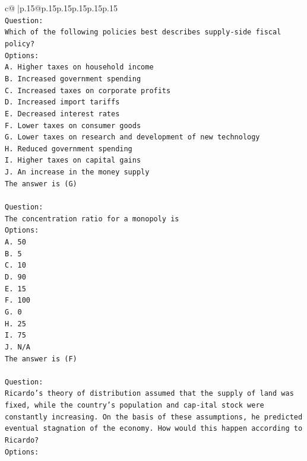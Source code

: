 \documentclass{article}
\begin{document}
{\begin{supertabular}{c@{$\;$}|p{.15\linewidth}@{}p{.15\linewidth}p{.15\linewidth}p{.15\linewidth}p{.15\linewidth}p{.15\linewidth}}
{{{\\ 
\texttt{Question:} \\
\texttt{Which of the following policies best describes supply{-}side fiscal policy?} \\
\texttt{Options:} \\
\texttt{A. Higher taxes on household income} \\
\texttt{B. Increased government spending} \\
\texttt{C. Increased taxes on corporate profits} \\
\texttt{D. Increased import tariffs} \\
\texttt{E. Decreased interest rates} \\
\texttt{F. Lower taxes on consumer goods} \\
\texttt{G. Lower taxes on research and development of new technology} \\
\texttt{H. Reduced government spending} \\
\texttt{I. Higher taxes on capital gains} \\
\texttt{J. An increase in the money supply} \\
\texttt{The answer is (G)} \\
\\ 
\texttt{Question:} \\
\texttt{The concentration ratio for a monopoly is} \\
\texttt{Options:} \\
\texttt{A. 50} \\
\texttt{B. 5} \\
\texttt{C. 10} \\
\texttt{D. 90} \\
\texttt{E. 15} \\
\texttt{F. 100} \\
\texttt{G. 0} \\
\texttt{H. 25} \\
\texttt{I. 75} \\
\texttt{J. N/A} \\
\texttt{The answer is (F)} \\
\\ 
\texttt{Question:} \\
\texttt{Ricardo's theory of distribution assumed that the supply of land was fixed, while the country's population and cap{-}ital stock were constantly increasing. On the basis of these assumptions, he predicted eventual stagnation of the economy. How would this happen according to Ricardo?} \\
\texttt{Options:} \\
}}}
\end{supertabular}}
\end{document}
